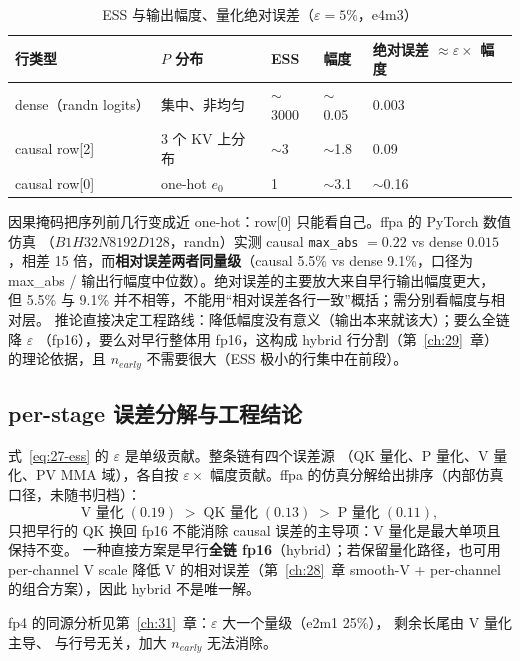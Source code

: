 \begin{table}[htbp]
  \centering
  \caption{ESS 与输出幅度、量化绝对误差（$\varepsilon = 5\%$，e4m3）}
  \label{tab:27-ess}
  \begin{tabular}{lllll}
    \toprule
    行类型 & $P$ 分布 & ESS & 幅度 & 绝对误差 $\approx \varepsilon \times$ 幅度 \\
    \midrule
    dense（randn logits） & 集中、非均匀 & $\sim$3000 & $\sim$0.05 & 0.003 \\
    causal row[2] & 3 个 KV 上分布 & $\sim$3 & $\sim$1.8 & 0.09 \\
    causal row[0] & one-hot $e_0$ & 1 & $\sim$3.1 & $\sim$0.16 \\
    \bottomrule
  \end{tabular}
\end{table}

因果掩码把序列前几行变成近 one-hot：row[0] 只能看自己。ffpa 的 PyTorch 数值仿真
（$B1H32N8192D128$，randn）实测 causal \texttt{max\_abs} $= 0.22$ vs dense
$0.015$，相差 15 倍，而\textbf{相对误差两者同量级}（causal 5.5\% vs dense
9.1\%，口径为 max\_abs / 输出行幅度中位数）。绝对误差的主要放大来自早行输出幅度更大，
但 5.5\% 与 9.1\% 并不相等，不能用“相对误差各行一致”概括；需分别看幅度与相对层。
推论直接决定工程路线：降低幅度没有意义（输出本来就该大）；要么全链降 $\varepsilon$
（fp16），要么对早行整体用 fp16，这构成 hybrid 行分割（第~\ref{ch:29}~章）
的理论依据，且 $n_{early}$ 不需要很大（ESS 极小的行集中在前段）。

\subsection{per-stage 误差分解与工程结论}

式~\ref{eq:27-ess} 的 $\varepsilon$ 是单级贡献。整条链有四个误差源
（QK 量化、P 量化、V 量化、PV MMA 域），各自按
$\varepsilon \times$ 幅度贡献。ffpa 的仿真分解给出排序（内部仿真口径，未随书归档）：
\begin{equation}
  \text{V 量化}\;(0.19) \;>\; \text{QK 量化}\;(0.13) \;>\; \text{P 量化}\;(0.11),
\end{equation}
只把早行的 QK 换回 fp16 不能消除 causal 误差的主导项：V 量化是最大单项且保持不变。
一种直接方案是早行\textbf{全链 fp16}（hybrid）；若保留量化路径，也可用
per-channel V scale 降低 V 的相对误差（第~\ref{ch:28}~章 smooth-V + per-channel
的组合方案），因此 hybrid 不是唯一解。

fp4 的同源分析见第~\ref{ch:31}~章：$\varepsilon$ 大一个量级（e2m1 25\%），
剩余长尾由 V 量化主导、
与行号无关，加大 $n_{early}$ 无法消除。

